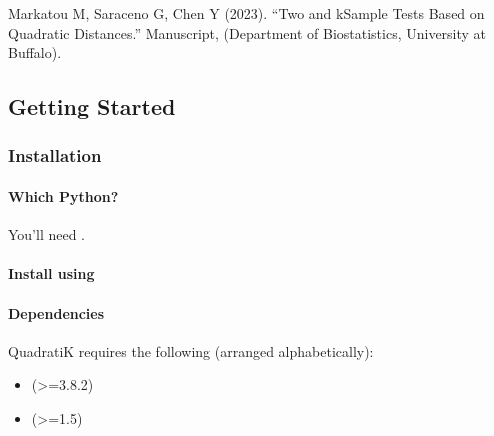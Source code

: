 \documentclass[letterpaper,10pt,english,openany,oneside]{sphinxmanual}
\begin{document}
{{{{\sphinxAtStartPar
Markatou M, Saraceno G, Chen Y (2023). “Two\sphinxhyphen{} and k\sphinxhyphen{}Sample Tests Based on Quadratic Distances.”
Manuscript, (Department of Biostatistics, University at Buffalo).

\sphinxstepscope


\subsection{Getting Started}
\label{\detokenize{getting_started/index:getting-started}}\label{\detokenize{getting_started/index::doc}}
\sphinxstepscope


\subsubsection{Installation}
\label{\detokenize{getting_started/installation:installation}}\label{\detokenize{getting_started/installation::doc}}

\paragraph{Which Python?}
\label{\detokenize{getting_started/installation:which-python}}\label{\detokenize{getting_started/installation:id1}}
\sphinxAtStartPar
You’ll need .


\paragraph{Install using }
\label{\detokenize{getting_started/installation:install-using-pip}}
\sphinxAtStartPar
{}


\paragraph{Dependencies}
\label{\detokenize{getting_started/installation:dependencies}}
\sphinxAtStartPar
QuadratiK requires the following (arranged alphabetically):
\begin{itemize}
\item {} 
\sphinxAtStartPar
{} (\textgreater{}=3.8.2)

\item {} 
\sphinxAtStartPar
{} (\textgreater{}=1.5)


\end{itemize}}}}}
\end{document}
